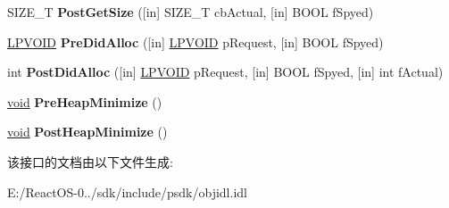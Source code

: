 \begin{DoxyCompactItemize}
\item 
\mbox{\label{interface_i_malloc_spy_acab165ffc9d5bc0114fd32c98a798512}} 
S\+I\+Z\+E\+\_\+T {\bfseries Post\+Get\+Size} (\mbox{[}in\mbox{]} S\+I\+Z\+E\+\_\+T cb\+Actual, \mbox{[}in\mbox{]} B\+O\+OL f\+Spyed)
\item 
\mbox{\label{interface_i_malloc_spy_a7e69f2b6a0663bd8ab3ed9019500c8ec}} 
\hyperlink{interfacevoid}{L\+P\+V\+O\+ID} {\bfseries Pre\+Did\+Alloc} (\mbox{[}in\mbox{]} \hyperlink{interfacevoid}{L\+P\+V\+O\+ID} p\+Request, \mbox{[}in\mbox{]} B\+O\+OL f\+Spyed)
\item 
\mbox{\label{interface_i_malloc_spy_ad6898a967f6520bddf5c06257c01ba89}} 
int {\bfseries Post\+Did\+Alloc} (\mbox{[}in\mbox{]} \hyperlink{interfacevoid}{L\+P\+V\+O\+ID} p\+Request, \mbox{[}in\mbox{]} B\+O\+OL f\+Spyed, \mbox{[}in\mbox{]} int f\+Actual)
\item 
\mbox{\label{interface_i_malloc_spy_aaa2611f42c896996fc8cc6a49ed0ae78}} 
\hyperlink{interfacevoid}{void} {\bfseries Pre\+Heap\+Minimize} ()
\item 
\mbox{\label{interface_i_malloc_spy_a7d439b30033f76cad1a43f7ee01430f5}} 
\hyperlink{interfacevoid}{void} {\bfseries Post\+Heap\+Minimize} ()
\end{DoxyCompactItemize}


该接口的文档由以下文件生成\+:\begin{DoxyCompactItemize}
\item 
E\+:/\+React\+O\+S-\/0../sdk/include/psdk/objidl.\+idl\end{DoxyCompactItemize}
